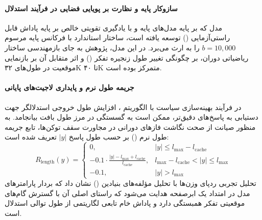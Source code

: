 \item {}

\paragraph*{سازوکار پایه و نظارت بر پویایی فضایی در فرآیند استدلال}
مدل  \cite{mistral2025magistral} که بر پایه مدل‌های پایه  و  با یادگیری تقویتی خالص بر پایه پاداش قابل راستی‌آزمایی () توسعه یافته است، ساختار استاندارد  با فرکانس پایه مرسوم $b = 10,000$ را به ارث می‌برد. در این مدل، پژوهش به جای بازمهندسی ساختار ریاضیاتی دوران، بر چگونگی تغییر طول زنجیره تفکر () و اثر متقابل آن بر بازنمایی موقعیت در طول‌های ۳۲K تا ۴۰K متمرکز بوده است.

\paragraph*{جریمه طول نرم و پایداری لاجیت‌های پایانی}
در فرآیند بهینه‌سازی سیاست با الگوریتم ، افزایش طول خروجی استدلالگر جهت دستیابی به پاسخ‌های دقیق‌تر، ممکن است به گسستگی در مرز طول بافت بیانجامد. به منظور صیانت از صحت نگاشت فازهای دورانی در مجاورت سقف توکن‌ها، تابع جریمه طول نرم () بر حسب طول پاسخ $|y|$ تعریف شده است:
\begin{equation}
    R_{\text{length}}(y) = \begin{cases} 
    0, & |y| \le l_{\max} - l_{\text{cache}} \\
    -0.1 \cdot \frac{|y| - l_{\max} + l_{\text{cache}}}{l_{\text{cache}}}, & l_{\max} - l_{\text{cache}} < |y| \le l_{\max} \\
    -0.1, & |y| > l_{\max}
    \end{cases}
\end{equation}
تحلیل تجربی ردپای وزن‌ها با تحلیل مؤلفه‌های بنیادین () نشان داد که بردار پارامترهای مدل در امتداد یک ابرصفحه هدایت می‌شود که راستای اصلی آن با گسترش گام‌های موقعیتی تفکر همبستگی دارد و پاداش خام تابعی لگاریتمی از طول توالی استدلال است.